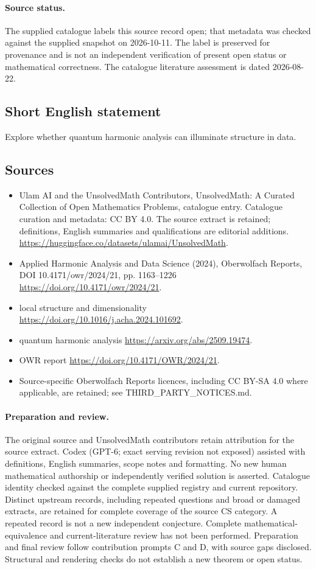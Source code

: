 \documentclass[11pt]{article}
\begin{document}
\paragraph{Source status.}
The supplied catalogue labels this source record open; that metadata was checked against the supplied snapshot on 2026-10-11. The label is preserved for provenance and is not an independent verification of present open status or mathematical correctness. The catalogue literature assessment is dated 2026-08-22.
\subsection{Short English statement}
Explore whether quantum harmonic analysis can illuminate structure in data.
\subsection{Sources}
\begin{itemize}
\item[S1] Ulam AI and the UnsolvedMath Contributors, UnsolvedMath: A Curated Collection of Open Mathematics Problems, catalogue entry. Catalogue curation and metadata: CC BY 4.0. The source extract is retained; definitions, English summaries and qualifications are editorial additions.
\url{https://huggingface.co/datasets/ulamai/UnsolvedMath}.
\item[S2] Applied Harmonic Analysis and Data Science (2024), Oberwolfach Reports, DOI 10.4171/owr/2024/21, pp. 1163--1226
\url{https://doi.org/10.4171/owr/2024/21}.
\item[S3] local structure and dimensionality
\url{https://doi.org/10.1016/j.acha.2024.101692}.
\item[S4] quantum harmonic analysis
\url{https://arxiv.org/abs/2509.19474}.
\item[S5] OWR report
\url{https://doi.org/10.4171/OWR/2024/21}.
\item Source-specific Oberwolfach Reports licences, including CC BY-SA 4.0 where applicable, are retained; see THIRD\_PARTY\_NOTICES.md.
\end{itemize}
\paragraph{Preparation and review.}
The original source and UnsolvedMath contributors retain attribution for the source extract. Codex (GPT-6; exact serving revision not exposed) assisted with definitions, English summaries, scope notes and formatting. No new human mathematical authorship or independently verified solution is asserted. Catalogue identity checked against the complete supplied registry and current repository. Distinct upstream records, including repeated questions and broad or damaged extracts, are retained for complete coverage of the source CS category. A repeated record is not a new independent conjecture. Complete mathematical-equivalence and current-literature review has not been performed. Preparation and final review follow contribution prompts C and D, with source gaps disclosed. Structural and rendering checks do not establish a new theorem or open status.
\label{end:statement}
\end{document}
